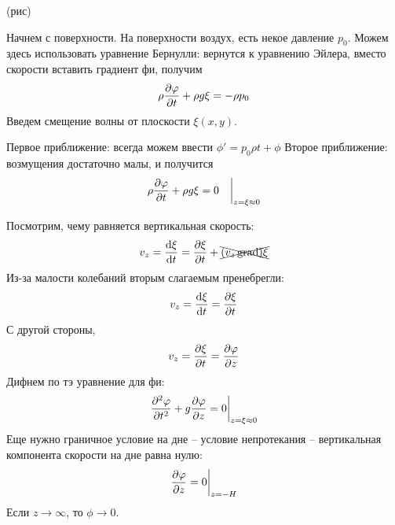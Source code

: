(рис)

Начнем с поверхности. На поверхности воздух, есть некое давление $p_0$. Можем здесь использовать уравнение Бернулли: вернутся к уравнению Эйлера, вместо скорости вставить градиент фи, получим
\begin{equation}
	\rho\pdv{\varphi}{t}+\rho g\xi=-\rho p_0
\end{equation}
Введем смещение волны от плоскости $\xi(x,y)$.

Первое приближение: всегда можем ввести $\phi'=p_0\rho t+\phi$
Второе приближение: возмущения достаточно малы, и получится
\begin{equation}
	\rho\pdv{\varphi}{t}+\rho g\xi=0 \quad \bigg|_{z=\xi\approx0}
\end{equation}

Посмотрим, чему равняется вертикальная скорость:
\begin{equation}
	v_z=\dv{\xi}{t}=\pdv{\xi}{t}+\xcancel{(v_z\operatorname{grad})\xi}
\end{equation}
Из-за малости колебаний вторым слагаемым пренебрегли:
\begin{equation}
	v_z=\dv{\xi}{t}=\pdv{\xi}{t}
\end{equation}
С другой стороны, 
\begin{equation}
	v_z=\pdv{\xi}{t}=\pdv{\varphi}{z}
\end{equation}
Дифнем по тэ уравнение для фи:
\begin{equation}
	\pdv[2]{\varphi}{t}+g\pdv{\varphi}{z}=0\bigg|_{z=\xi\approx0}
\end{equation}
Еще нужно граничное условие на дне -- условие непротекания -- вертикальная компонента скорости на дне равна нулю:
\begin{equation}
	\pdv{\varphi}{z}=0 \bigg|_{z=-H}
\end{equation}
Если $z\to\infty$, то $\phi \to 0$.

